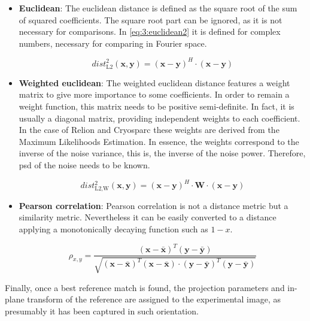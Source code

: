 \documentclass[../main.tex]{subfiles}
\begin{document}
\begin{itemize}
    \item \textbf{Euclidean}: The euclidean distance is defined as the square root of the sum of squared coefficients. The square root part can be ignored, as it is not necessary for comparisons. In \eqref{eq:3:euclidean2} it is defined for complex numbers, necessary for comparing in Fourier space.

    \begin{equation}\label{eq:3:euclidean2}
        dist^2_{\text{L2}}(\bm{x}, \bm{y}) = (\bm{x}-\bm{y})^H \cdot (\bm{x}-\bm{y})
    \end{equation}
    
    \item \textbf{Weighted euclidean}: The weighted euclidean distance features a weight matrix to give more importance to some coefficients. In order to remain a weight function, this matrix needs to be positive semi-definite. In fact, it is usually a diagonal matrix, providing independent weights to each coefficient. In the case of Relion\cite{scheres2021} and Cryosparc\cite{cryosparc} these weights are derived from the Maximum Likelihoods Estimation. In essence, the weights correspond to the inverse of the noise variance, this is, the inverse of the noise power. Therefore, \gls{psd} of the noise needs to be known.
    
    \begin{equation}\label{eq:3:euclidean2_weighted}
        dist^2_{\text{L2,W}}(\bm{x}, \bm{y}) = (\bm{x}-\bm{y})^H \cdot \bm{W} \cdot (\bm{x}-\bm{y})
    \end{equation}
    
    \item \textbf{Pearson correlation}: Pearson correlation is not a distance metric but a similarity metric. Nevertheless it can be easily converted to a distance applying a monotonically decaying function such as $1-x$.
    
    \begin{equation}\label{eq:3:pearson}
        \rho_{x,y} =    \frac{
                        (\bm{x}-\bar{\bm{x}})^T(\bm{y}-\bar{\bm{y}})
                        }{
                        \sqrt{(\bm{x}-\bar{\bm{x}})^T(\bm{x}-\bar{\bm{x}}) \cdot (\bm{y}-\bar{\bm{y}})^T(\bm{y}-\bar{\bm{y}})}
                        }
    \end{equation}
\end{itemize}

Finally, once a best reference match is found, the projection parameters and in-plane transform of the reference are assigned to the experimental image, as presumably it has been captured in such orientation.
\end{document}
